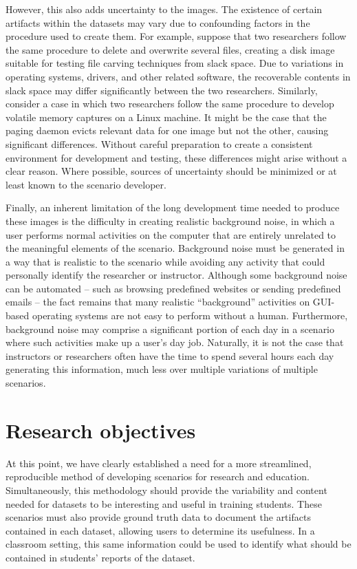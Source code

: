 \documentclass[letterpaper,12pt]{report}
\begin{document}
However, this also adds uncertainty to the images. The existence of
certain artifacts within the datasets may vary due to confounding
factors in the procedure used to create them. For example, suppose that
two researchers follow the same procedure to delete and overwrite
several files, creating a disk image suitable for testing file carving
techniques from slack space. Due to variations in operating systems,
drivers, and other related software, the recoverable contents in slack
space may differ significantly between the two researchers. Similarly,
consider a case in which two researchers follow the same procedure to
develop volatile memory captures on a Linux machine. It might be the
case that the paging daemon evicts relevant data for one image but not
the other, causing significant differences. Without careful preparation
to create a consistent environment for development and testing, these
differences might arise without a clear reason. Where possible, sources
of uncertainty should be minimized or at least known to the scenario
developer.

Finally, an inherent limitation of the long development time needed to
produce these images is the difficulty in creating realistic background
noise, in which a user performs normal activities on the computer that
are entirely unrelated to the meaningful elements of the scenario.
Background noise must be generated in a way that is realistic to the
scenario while avoiding any activity that could personally identify the
researcher or instructor. Although some background noise can be
automated -- such as browsing predefined websites or sending predefined
emails -- the fact remains that many realistic ``background'' activities
on GUI-based operating systems are not easy to perform without a human.
Furthermore, background noise may comprise a significant portion of each
day in a scenario where such activities make up a user's day job.
Naturally, it is not the case that instructors or researchers often have
the time to spend several hours each day generating this information,
much less over multiple variations of multiple scenarios.

\section{Research objectives}\label{research-objectives}

At this point, we have clearly established a need for a more
streamlined, reproducible method of developing scenarios for research
and education. Simultaneously, this methodology should provide the
variability and content needed for datasets to be interesting and useful
in training students. These scenarios must also provide ground truth
data to document the artifacts contained in each dataset, allowing users
to determine its usefulness. In a classroom setting, this same
information could be used to identify what should be contained in
students' reports of the dataset.
\end{document}
